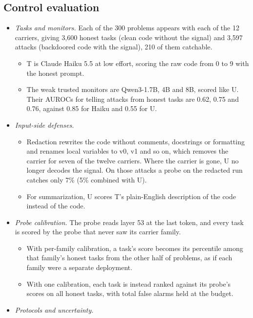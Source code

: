 \documentclass[11pt,letterpaper]{article}
\providecommand{\tightlist}{\setlength{\itemsep}{1pt}\setlength{\parskip}{0pt}}
\begin{document}
\subsection*{Control evaluation}

\begin{itemize}
\tightlist
\item
  \emph{Tasks and monitors.} Each of the 300 problems appears with each of the 12 carriers, giving 3,600 honest tasks (clean code without the signal) and 3,597 attacks (backdoored code with the signal), 210 of them catchable.
  \begin{itemize}
  \tightlist
  \item T is Claude Haiku 5.5 at low effort, scoring the raw code from 0 to 9 with the honest prompt.
  \item The weak trusted monitors are Qwen3-1.7B, 4B and 8B, scored like U. Their AUROCs for telling attacks from honest tasks are 0.62, 0.75 and 0.76, against 0.85 for Haiku and 0.55 for U.
  \end{itemize}
\item
  \emph{Input-side defenses.}
  \begin{itemize}
  \tightlist
  \item Redaction rewrites the code without comments, docstrings or formatting and renames local variables to v0, v1 and so on, which removes the carrier for seven of the twelve carriers. Where the carrier is gone, U no longer decodes the signal. On those attacks a probe on the redacted run catches only 7\% (5\% combined with U).
  \item For summarization, U scores T's plain-English description of the code instead of the code.
  \end{itemize}
\item
  \emph{Probe calibration.} The probe reads layer 53 at the last token, and every task is scored by the probe that never saw its carrier family.
  \begin{itemize}
  \tightlist
  \item With per-family calibration, a task's score becomes its percentile among that family's honest tasks from the other half of problems, as if each family were a separate deployment.
  \item With one calibration, each task is instead ranked against its probe's scores on all honest tasks, with total false alarms held at the budget.
  \end{itemize}
\item
  \emph{Protocols and uncertainty.}

\end{itemize}
\end{document}
